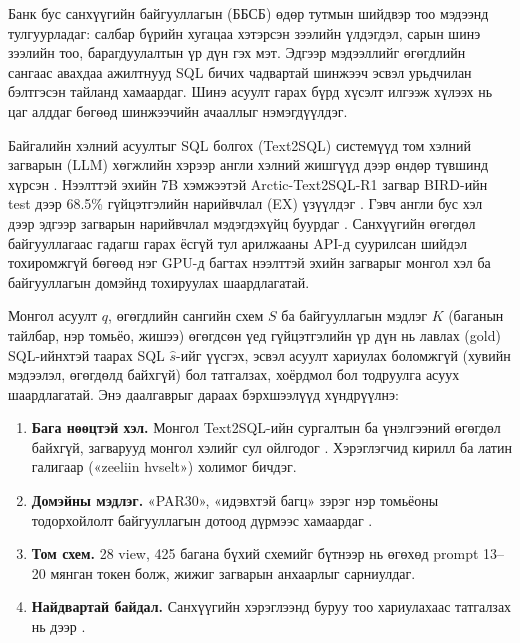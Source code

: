 
{}
\label{ch:intro}
\pagecolor{white}

\label{sec:motivation}

Банк бус санхүүгийн байгууллагын (ББСБ) өдөр тутмын шийдвэр тоо мэдээнд тулгуурладаг: салбар бүрийн хугацаа хэтэрсэн
зээлийн үлдэгдэл, сарын шинэ зээлийн тоо, барагдуулалтын үр дүн гэх мэт. Эдгээр мэдээллийг өгөгдлийн сангаас авахдаа
ажилтнууд SQL бичих чадвартай шинжээч эсвэл урьдчилан бэлтгэсэн тайланд хамаардаг. Шинэ асуулт гарах бүрд хүсэлт
илгээж хүлээх нь цаг алддаг бөгөөд шинжээчийн ачааллыг нэмэгдүүлдэг.

Байгалийн хэлний асуултыг SQL болгох (Text2SQL) системүүд том хэлний загварын (LLM) хөгжлийн хэрээр англи хэлний
жишгүүд дээр өндөр түвшинд хүрсэн \cite{shi_2025_survey_llm_text2sql, li_2023_bird}. Нээлттэй эхийн 7B хэмжээтэй
Arctic-Text2SQL-R1 загвар BIRD-ийн test дээр 68.5\% гүйцэтгэлийн нарийвчлал (EX) үзүүлдэг
\cite{yao_2025_arctic_text2sql_r1}. Гэвч англи бус хэл дээр эдгээр загварын нарийвчлал мэдэгдэхүйц буурдаг
\cite{dou_2023_multispider, pham_2026_multispider2}. Санхүүгийн өгөгдөл байгууллагаас гадагш гарах ёсгүй тул арилжааны
API-д суурилсан шийдэл тохиромжгүй бөгөөд нэг GPU-д багтах нээлттэй эхийн загварыг монгол хэл ба байгууллагын домэйнд
тохируулах шаардлагатай.

\label{sec:problem}

Монгол асуулт $q$, өгөгдлийн сангийн схем $S$ ба байгууллагын мэдлэг $K$ (баганын тайлбар, нэр томьёо, жишээ)
өгөгдсөн үед гүйцэтгэлийн үр дүн нь лавлах (gold) SQL-ийнхтэй таарах SQL $\hat{s}$-ийг үүсгэх, эсвэл асуулт хариулах
боломжгүй (хувийн мэдээлэл, өгөгдөлд байхгүй) бол татгалзах, хоёрдмол бол тодруулга асуух шаардлагатай. Энэ даалгаврыг
дараах бэрхшээлүүд хүндрүүлнэ:
\begin{enumerate}
  \item \textbf{Бага нөөцтэй хэл.} Монгол Text2SQL-ийн сургалтын ба үнэлгээний өгөгдөл байхгүй, загварууд монгол
        хэлийг сул ойлгодог \cite{zhang_2024_mm_eval}. Хэрэглэгчид кирилл ба латин галигаар («zeeliin hvselt») холимог бичдэг.
  \item \textbf{Домэйны мэдлэг.} «PAR30», «идэвхтэй багц» зэрэг нэр томьёоны тодорхойлолт байгууллагын дотоод дүрмээс
        хамаардаг \cite{li_2023_bird}.
  \item \textbf{Том схем.} 28 view, 425 багана бүхий схемийг бүтнээр нь өгөхөд prompt 13--20 мянган токен болж, жижиг
        загварын анхаарлыг сарниулдаг.
  \item \textbf{Найдвартай байдал.} Санхүүгийн хэрэглээнд буруу тоо хариулахаас татгалзах нь дээр
        \cite{lee_2024_trustsql}.
\end{enumerate}

